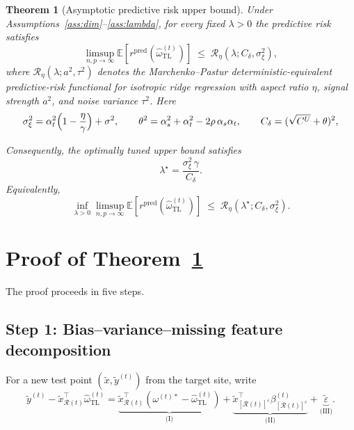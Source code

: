 \documentclass[11pt,a4paper]{article}
\newtheorem{theorem}{Theorem}
\theoremstyle{definition}
\newcommand{\E}{\mathbb{E}}
\newcommand{\cR}{\mathcal{R}}
\newcommand{\cRc}{[\cR(t)]^c}
\newcommand{\ohat}{\hat{\omega}_{\mathrm{TL}}^{(t)}}
\newcommand{\ostar}{\omega^{(t)*}}
\begin{document}
\begin{theorem}[Asymptotic predictive risk upper bound]%
\label{thm:main}
Under Assumptions~\ref{ass:dim}--\ref{ass:lambda}, for every fixed
$\lambda>0$ the predictive risk satisfies
\begin{equation}\label{eq:riskbound}
\boxed{
  \limsup_{n,p\to\infty}
  \E\!\left[r^{\mathrm{pred}}(\ohat)\right]
  \;\le\;
  \mathcal R_{\eta}\!\left(\lambda;C_\delta,\sigma_\xi^2\right),
}
\end{equation}
where $\mathcal R_{\eta}(\lambda;a^2,\tau^2)$ denotes the
Marchenko--Pastur deterministic-equivalent predictive-risk functional
for isotropic ridge regression with aspect ratio $\eta$, signal
strength $a^2$, and noise variance $\tau^2$.  Here
\begin{gather*}
  \sigma_\xi^{2}=\alpha_t^{2}\Bigl(1-\frac{\eta}{\gamma}\Bigr)
  +\sigma^{2},
  \qquad
  \theta^{2}=\alpha_s^{2}+\alpha_t^{2}-2\rho\,\alpha_s\alpha_t,
  \qquad
  C_\delta=(\sqrt{C^{U}}+\theta)^{2},
\end{gather*}

Consequently, the optimally tuned upper bound satisfies
\begin{equation}\label{eq:lambdastar}
  \lambda^{\star}=
  \frac{\sigma_\xi^{2}\,\gamma}{C_\delta}.
\end{equation}
Equivalently,
\begin{equation}\label{eq:main_unexpanded_opt}
\boxed{
  \inf_{\lambda>0}\limsup_{n,p\to\infty}
  \E\!\left[r^{\mathrm{pred}}(\ohat)\right]
  \;\le\;
  \mathcal R_{\eta}\!\left(\lambda^\star;C_\delta,\sigma_\xi^2\right).
}
\end{equation}
\end{theorem}

\section{Proof of Theorem~\ref{thm:main}}\label{sec:proof}

The proof proceeds in five steps.

\subsection*{Step 1: Bias--variance--missing feature decomposition}

For a new test point $(\tilde x,\tilde y^{(t)})$ from the target
site, write
\[
  \tilde y^{(t)}-\tilde x_{\cR(t)}^{\top}\ohat
  =\underbrace{\tilde x_{\cR(t)}^{\top}(\ostar-\ohat)}_{\text{(I)}}
  +\underbrace{\tilde x_{\cRc}^{\top}\beta^{(t)}_{\cRc}}_{\text{(II)}}
  +\underbrace{\tilde\varepsilon}_{\text{(III)}}.
\]
\end{document}
